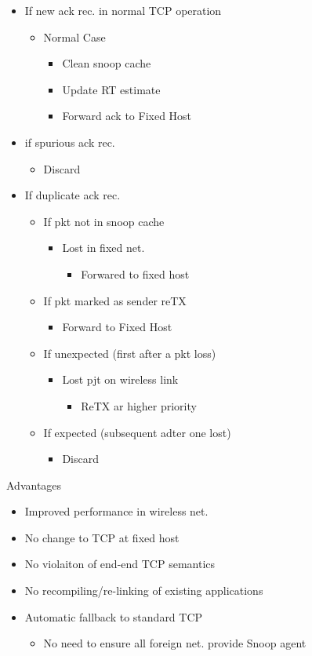 \begin{itemize}
	\item If new ack rec. in normal TCP operation
	\begin{itemize}
		\item Normal Case
		\begin{itemize}
			\item Clean snoop cache
			\item Update RT estimate
			\item Forward ack to Fixed Host
		\end{itemize}
	\end{itemize}
	\item if spurious ack rec.
	\begin{itemize}
		\item Discard
	\end{itemize}
	\item If duplicate ack rec.
	\begin{itemize}
		\item If pkt not in snoop cache
		\begin{itemize}
			\item Lost in fixed net.
			\begin{itemize}
				\item Forwared to fixed host
			\end{itemize}
		\end{itemize}
		\item If pkt marked as sender reTX
		\begin{itemize}
			\item Forward to Fixed Host
		\end{itemize}
		\item If unexpected (first after a pkt loss)
		\begin{itemize}
			\item Lost pjt on wireless link
			\begin{itemize}
				\item ReTX ar higher priority
			\end{itemize}
		\end{itemize}
		\item If expected (subsequent adter one lost)
		\begin{itemize}
			\item Discard
		\end{itemize}
	\end{itemize}
\end{itemize}
Advantages
\begin{itemize}
	\item Improved performance in wireless net.
	\item No change to TCP at fixed host
	\item No violaiton of end-end TCP semantics
	\item No recompiling/re-linking of existing applications
	\item Automatic fallback to standard TCP
	\begin{itemize}
		\item No need to ensure all foreign net. provide Snoop agent
	\end{itemize}
\end{itemize}
